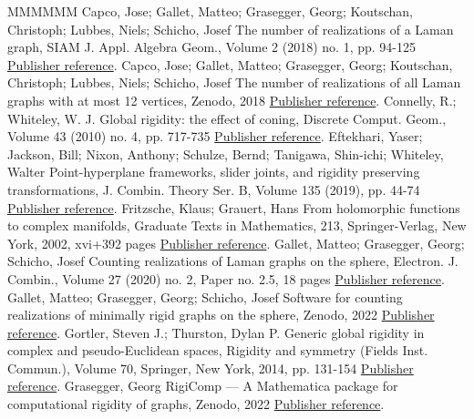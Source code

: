 \documentclass[11pt]{article}
\theoremstyle{definition}
\numberwithin{equation}{section}
\begin{document}
\begin{thebibliography}{MMMMMM}
 Capco, Jose; Gallet, Matteo; Grasegger, Georg; Koutschan, Christoph; Lubbes, Niels; Schicho, Josef The number of realizations of a Laman graph, SIAM J. Appl. Algebra Geom., Volume 2 (2018) no. 1, pp. 94-125 \href{https://alco.centre-mersenne.org/articles/10.5802/alco.390/#PlaneCount}{Publisher reference}.
 Capco, Jose; Gallet, Matteo; Grasegger, Georg; Koutschan, Christoph; Lubbes, Niels; Schicho, Josef The number of realizations of all Laman graphs with at most 12 vertices, Zenodo, 2018 \href{https://alco.centre-mersenne.org/articles/10.5802/alco.390/#ZenodoData}{Publisher reference}.
 Connelly, R.; Whiteley, W. J. Global rigidity: the effect of coning, Discrete Comput. Geom., Volume 43 (2010) no. 4, pp. 717-735 \href{https://alco.centre-mersenne.org/articles/10.5802/alco.390/#cw10}{Publisher reference}.
 Eftekhari, Yaser; Jackson, Bill; Nixon, Anthony; Schulze, Bernd; Tanigawa, Shin-ichi; Whiteley, Walter Point-hyperplane frameworks, slider joints, and rigidity preserving transformations, J. Combin. Theory Ser. B, Volume 135 (2019), pp. 44-74 \href{https://alco.centre-mersenne.org/articles/10.5802/alco.390/#EJNSTW19}{Publisher reference}.
 Fritzsche, Klaus; Grauert, Hans From holomorphic functions to complex manifolds, Graduate Texts in Mathematics, 213, Springer-Verlag, New York, 2002, xvi+392 pages \href{https://alco.centre-mersenne.org/articles/10.5802/alco.390/#FG02}{Publisher reference}.
 Gallet, Matteo; Grasegger, Georg; Schicho, Josef Counting realizations of Laman graphs on the sphere, Electron. J. Combin., Volume 27 (2020) no. 2, Paper no. 2.5, 18 pages \href{https://alco.centre-mersenne.org/articles/10.5802/alco.390/#SphereCount}{Publisher reference}.
 Gallet, Matteo; Grasegger, Georg; Schicho, Josef Software for counting realizations of minimally rigid graphs on the sphere, Zenodo, 2022 \href{https://alco.centre-mersenne.org/articles/10.5802/alco.390/#SphereAlg}{Publisher reference}.
 Gortler, Steven J.; Thurston, Dylan P. Generic global rigidity in complex and pseudo-Euclidean spaces, Rigidity and symmetry (Fields Inst. Commun.), Volume 70, Springer, New York, 2014, pp. 131-154 \href{https://alco.centre-mersenne.org/articles/10.5802/alco.390/#Gortler2014}{Publisher reference}.
 Grasegger, Georg RigiComp — A Mathematica package for computational rigidity of graphs, Zenodo, 2022 \href{https://alco.centre-mersenne.org/articles/10.5802/alco.390/#RigiComp}{Publisher reference}.

\end{thebibliography}
\end{document}
